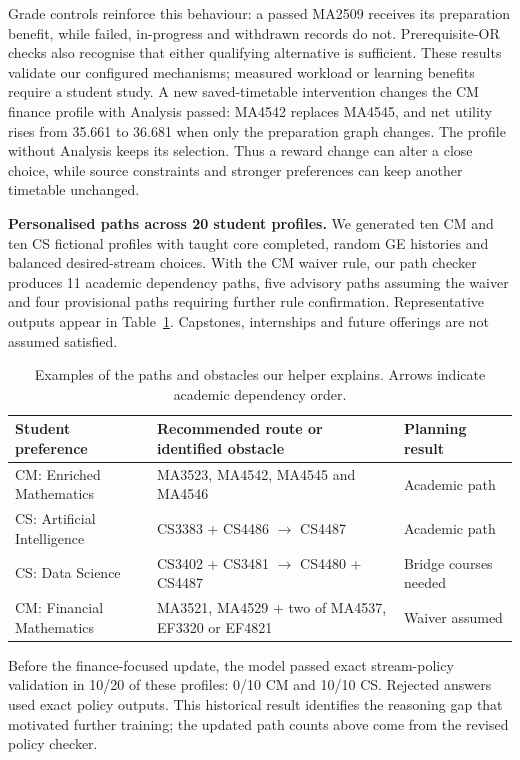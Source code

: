 \documentclass{article}
\begin{document}
Grade controls reinforce this behaviour: a passed MA2509 receives its preparation benefit, while failed, in-progress and withdrawn records do not. Prerequisite-OR checks also recognise that either qualifying alternative is sufficient. These results validate our configured mechanisms; measured workload or learning benefits require a student study. A new saved-timetable intervention changes the CM finance profile with Analysis passed: MA4542 replaces MA4545, and net utility rises from 35.661 to 36.681 when only the preparation graph changes. The profile without Analysis keeps its selection. Thus a reward change can alter a close choice, while source constraints and stronger preferences can keep another timetable unchanged.

\textbf{Personalised paths across 20 student profiles.} We generated ten CM and ten CS fictional profiles with taught core completed, random GE histories and balanced desired-stream choices. With the CM waiver rule, our path checker produces 11 academic dependency paths, five advisory paths assuming the waiver and four provisional paths requiring further rule confirmation. Representative outputs appear in Table~\ref{tab:examples}. Capstones, internships and future offerings are not assumed satisfied.

\begin{table}[H]
\centering\small
\caption{Examples of the paths and obstacles our helper explains. Arrows indicate academic dependency order.}
\begin{tabular}{p{1.4in}p{2.2in}p{1.4in}}
\toprule
Student preference & Recommended route or identified obstacle & Planning result\\
\midrule
CM: Enriched Mathematics & MA3523, MA4542, MA4545 and MA4546 & Academic path\\
CS: Artificial Intelligence & CS3383 + CS4486 $\rightarrow$ CS4487 & Academic path\\
CS: Data Science & CS3402 + CS3481 $\rightarrow$ CS4480 + CS4487 & Bridge courses needed\\
CM: Financial Mathematics & {\raggedright MA3521, MA4529 + two of MA4537, EF3320 or EF4821\par} & Waiver assumed\\
\bottomrule
\end{tabular}
\label{tab:examples}
\end{table}

Before the finance-focused update, the model passed exact stream-policy validation in 10/20 of these profiles: 0/10 CM and 10/10 CS. Rejected answers used exact policy outputs. This historical result identifies the reasoning gap that motivated further training; the updated path counts above come from the revised policy checker.
\end{document}
